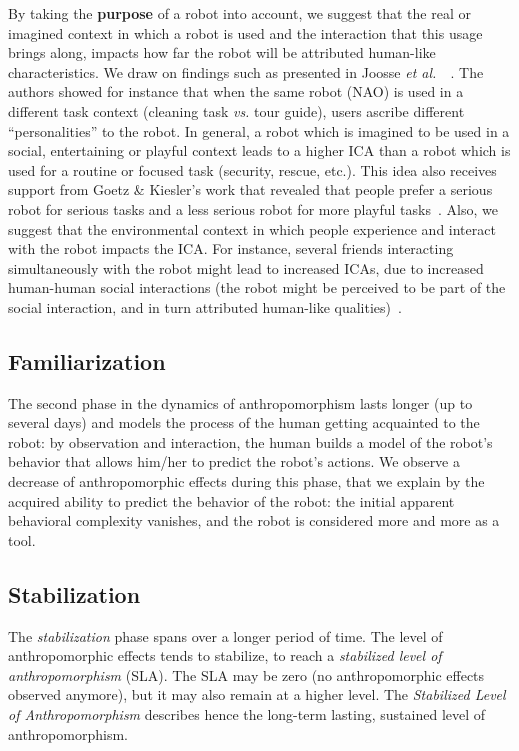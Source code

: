 \documentclass{sig-alternate-2013}
\newcommand{\etal}{{\textit{et al.~}}}
\begin{document}
By taking the \textbf{purpose} of a robot into account, we suggest that the real
or imagined context in which a robot is used and the interaction that this usage
brings along, impacts how far the robot will be attributed human-like
characteristics. We draw on findings such as presented in Joosse
\etal~\cite{joosse_what_2013}. The authors showed for instance that when the
same robot (NAO) is used in a different task context (cleaning task \emph{vs.}
tour guide), users ascribe different ``personalities'' to the robot. In general,
a robot which is imagined to be used in a social, entertaining or playful
context leads to a higher ICA than a robot which is used for a routine or
focused task (security, rescue, etc.). This idea also receives support from
Goetz \& Kiesler's work that revealed that people prefer a serious robot for
serious tasks and a less serious robot for more playful
tasks~\cite{goetz_cooperation_2002, goetz_matching_2003}. Also, we suggest that
the environmental context in which people experience and interact with the robot
impacts the ICA. For instance, several friends interacting simultaneously with
the robot might lead to increased ICAs, due to increased human-human social
interactions (the robot might be perceived to be part of the social interaction,
and in turn attributed human-like qualities)~\cite{baxter2013do}.


\subsection*{Familiarization} The second phase in the dynamics of
anthropomorphism lasts longer (up to several days) and models the process of the
human getting acquainted to the robot: by observation and interaction, the human
builds a model of the robot's behavior that allows him/her to predict the
robot's actions. We observe a decrease of anthropomorphic effects during this
phase, that we explain by the acquired ability to predict the behavior of the
robot: the initial apparent behavioral complexity vanishes, and the robot is
considered more and more as a tool.

\subsection*{Stabilization} The \emph{stabilization} phase spans over a longer
period of time. The level of anthropomorphic effects tends to stabilize, to
reach a \emph{stabilized level of anthropomorphism} (SLA). The SLA may be zero
(no anthropomorphic effects observed anymore), but it may also remain at a
higher level. The \emph{Stabilized Level of Anthropomorphism} describes hence
the long-term lasting, sustained level of anthropomorphism.
\end{document}

